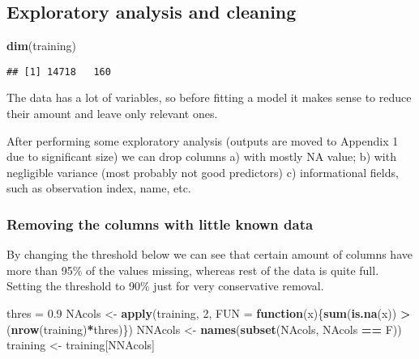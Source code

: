 \documentclass[]{article}
\newenvironment{Shaded}{\begin{snugshade}}{\end{snugshade}}
\newcommand{\KeywordTok}[1]{\textcolor[rgb]{0.13,0.29,0.53}{\textbf{#1}}}
\newcommand{\DataTypeTok}[1]{\textcolor[rgb]{0.13,0.29,0.53}{#1}}
\newcommand{\DecValTok}[1]{\textcolor[rgb]{0.00,0.00,0.81}{#1}}
\newcommand{\FloatTok}[1]{\textcolor[rgb]{0.00,0.00,0.81}{#1}}
\newcommand{\StringTok}[1]{\textcolor[rgb]{0.31,0.60,0.02}{#1}}
\newcommand{\ControlFlowTok}[1]{\textcolor[rgb]{0.13,0.29,0.53}{\textbf{#1}}}
\newcommand{\OperatorTok}[1]{\textcolor[rgb]{0.81,0.36,0.00}{\textbf{#1}}}
\newcommand{\NormalTok}[1]{#1}
\begin{document}
\subsection{Exploratory analysis and
cleaning}\label{exploratory-analysis-and-cleaning}

\begin{Shaded}
\begin{Highlighting}[]
\KeywordTok{dim}\NormalTok{(training)}
\end{Highlighting}
\end{Shaded}

\begin{verbatim}
## [1] 14718   160
\end{verbatim}

The data has a lot of variables, so before fitting a model it makes
sense to reduce their amount and leave only relevant ones.

After performing some exploratory analysis (outputs are moved to
Appendix 1 due to significant size) we can drop columns a) with mostly
NA value; b) with negligible variance (most probably not good
predictors) c) informational fields, such as observation index, name,
etc.

\subsubsection{Removing the columns with little known
data}\label{removing-the-columns-with-little-known-data}

By changing the threshold below we can see that certain amount of
columns have more than 95\% of the values missing, whereas rest of the
data is quite full. Setting the threshold to 90\% just for very
conservative removal.

\begin{Shaded}
\begin{Highlighting}[]
\NormalTok{thres =}\StringTok{ }\FloatTok{0.9}
\NormalTok{NAcols <-}\StringTok{ }\KeywordTok{apply}\NormalTok{(training, }\DecValTok{2}\NormalTok{,  }
        \DataTypeTok{FUN =} \ControlFlowTok{function}\NormalTok{(x)\{}\KeywordTok{sum}\NormalTok{(}\KeywordTok{is.na}\NormalTok{(x)) }\OperatorTok{>}\StringTok{ }\NormalTok{(}\KeywordTok{nrow}\NormalTok{(training)}\OperatorTok{*}\NormalTok{thres)\})}
\NormalTok{NNAcols <-}\StringTok{ }\KeywordTok{names}\NormalTok{(}\KeywordTok{subset}\NormalTok{(NAcols, NAcols }\OperatorTok{==}\StringTok{ }\NormalTok{F))}
\NormalTok{training <-}\StringTok{ }\NormalTok{training[NNAcols]}
\end{Highlighting}
\end{Shaded}
\end{document}

